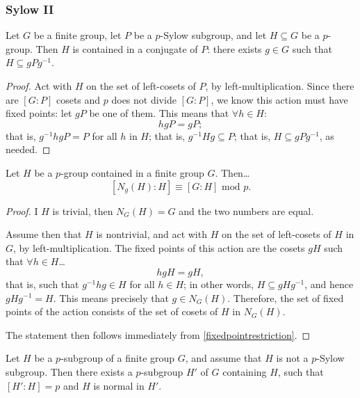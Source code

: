 \subsubsection{Sylow II}\label{sylow2}

\begin{theorem}
\label{sylowthm2}
Let $G$ be a finite group, let $P$ be a $p$-Sylow subgroup, and let $H \subseteq G$ be a $p$-group. Then $H$ is contained
in a conjugate of $P$: there exists $g \in G$ such that $H \subseteq gPg^{-1}$.
\end{theorem}

\begin{proof}
Act with $H$ on the set of left-cosets of $P$, by left-multiplication. Since there are $[G : P]$ cosets and $p$ does not divide
$[G : P]$, we know this action must have fixed points: let $gP$ be one of them. This means that $\forall h \in H$:
$$hgP = gP;$$
that is, $g^{-1}hgP = P$ for all $h$ in $H$; that is, $g^{-1}Hg \subseteq P$; that is, $H \subseteq gPg^{-1}$, as needed.
\end{proof}

\begin{lemma}
\label{indexinnormalizer}
Let $H$ be a $p$-group contained in a finite group $G$. Then\dots
$$[N_g(H) : H] \equiv [G : H] \textrm{ mod } p.$$
\end{lemma}

\begin{proof}
I $H$ is trivial, then $N_G(H) = G$ and the two numbers are equal.

Assume then that $H$ is nontrivial, and act with $H$ on the set of left-cosets of $H$ in $G$, by left-multiplication. The fixed points
of this action are the cosets $gH$ such that $\forall h \in H$\dots
$$hgH = gH,$$
that is, such that $g^{-1}hg \in H$ for all $h \in H$; in other words, $H \subseteq gHg^{-1}$, and hence $gHg^{-1} = H$. This means precisely that
$g \in N_G(H)$. Therefore, the set of fixed points of the action consists of the set of cosets of $H$ in $N_G(H)$.

The statement then follows immediately from \ref{fixedpointrestriction}.
\end{proof}

\begin{proposition}
Let $H$ be a $p$-subgroup of a finite group $G$, and assume that $H$ is not a $p$-Sylow subgroup. Then there exists a $p$-subgroup
$H'$ of $G$ containing $H$, such that $[H' : H] = p$ and $H$ is normal in $H'$.
\end{proposition}

